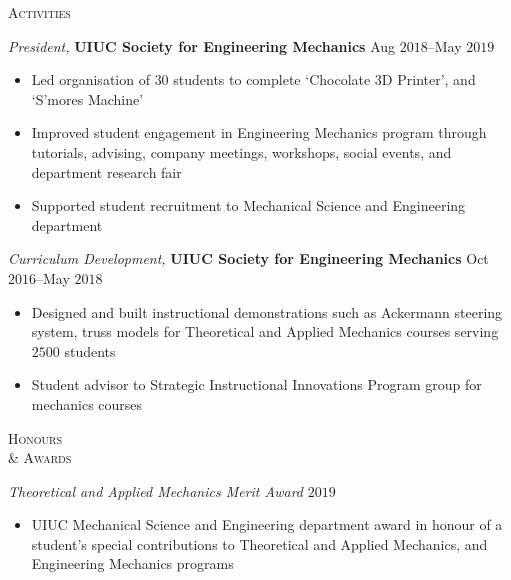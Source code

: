 \documentclass[10pt]{article}
\begin{document}
\begin{multicols}{2}
\textsc{Activities}
\columnbreak

{\sl President,} \textbf{UIUC Society for Engineering Mechanics} \hfill Aug $2018$--May $2019$

\vspace{-1.75em}
\begin{itemize}[label=-]
    \setlength\itemsep{-0.25em}
    \item Led organisation of $30$ students to complete `Chocolate 3D Printer', and `S'mores Machine'
    \item Improved student engagement in Engineering Mechanics program through tutorials, advising, company meetings, workshops, social events, and department research fair
    \item Supported student recruitment to Mechanical Science and Engineering department
\end{itemize}
\vspace{-2.0em}

\vspace{0.5em}
%
{\sl Curriculum Development,} \textbf{UIUC Society for Engineering Mechanics} \hfill Oct $2016$--May $2018$

\vspace{-1.75em}
\begin{itemize}[label=-]
    \setlength\itemsep{-0.25em}
    \item Designed and built instructional demonstrations such as  Ackermann steering system, truss models for Theoretical and Applied Mechanics courses serving $2500$ students
    \item Student advisor to Strategic Instructional Innovations Program group for mechanics courses
\end{itemize}
\vspace{-2.0em}

\end{multicols}
\vspace{-1.5em} 
\begin{multicols}{2}
\textsc{Honours \\ \& Awards}
\columnbreak

{\sl Theoretical and Applied Mechanics Merit Award} \hfill $2019$

\vspace{-1.75em}
\begin{itemize}[label= ]
    \setlength\itemsep{-0.25em}
    \item  UIUC Mechanical Science and Engineering department award in honour of a student's special contributions to Theoretical and Applied Mechanics, and Engineering Mechanics programs
\end{itemize}
\vspace{-2.0em}

\end{multicols}
\end{document}
